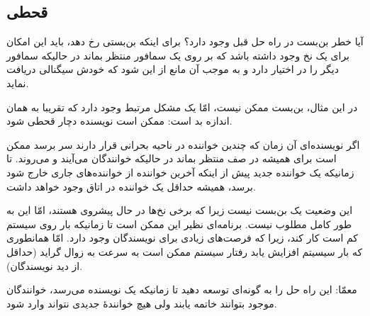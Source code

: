 \documentclass{book}
\begin{document}
\subsection{قحطی}

    آیا خطر بن‌بست در راه حل قبل وجود دارد؟ 
    برای اینکه بن‌بستی رخ دهد، باید این امکان برای یک نخ وجود داشته باشد که بر  روی یک سمافور منتظر بماند در حالیکه سمافور دیگر را در اختیار دارد و 
    به موجب آن مانع از این شود که خودش سیگنالی دریافت نماید. 

    در این مثال، بن‌بست ممکن نیست، امّا یک مشکل مرتبط وجود دارد که تقریبا به همان اندازه بد است:‌ ممکن است نویسنده دچار قحطی شود. 

    اگر نویسنده‌ای آن زمان که چندین خواننده در ناحیه بحرانی قرار دارند سر برسد ممکن است برای همیشه در صف منتظر بماند در حالیکه خوانندگان 
    می‌آیند و می‌روند. تا زمانیکه یک خواننده جدید پیش از اینکه آخرین خواننده از خواننده‌های جاری خارج شود برسد، همیشه حداقل یک خواننده در اتاق 
    وجود خواهد داشت. 
    

    این وضعیت یک بن‌بست نیست زیرا که برخی نخ‌ها در حال پیشروی هستند، امّا این به طور کامل مطلوب نیست. 
    برنامه‌ای نظیر این ممکن است تا زمانیکه بار روی سیستم کم است کار کند، زیرا که فرصت‌های زیادی برای نویسندگان وجود دارد. 
    امّا همانطوری که بار سیسیتم افزایش یابد رفتار سیستم ممکن است به سرعت به زوال گراید (حداقل از دید نویسندگان). 

    معمّا: این راه حل را به گونه‌ای توسعه دهید تا زمانیکه یک نویسنده می‌رسد، خوانندگان موجود بتوانند خاتمه یابند ولی هیچ خوانندهٔ جدیدی نتواند وارد شود. 
\end{document}
